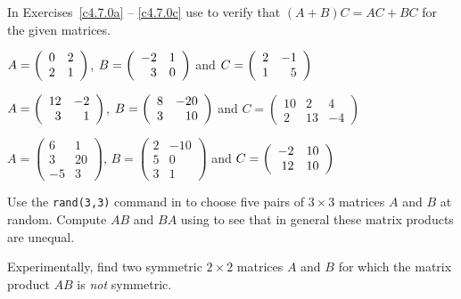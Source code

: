 \documentclass{ximera}
\begin{document}
\noindent In Exercises~\ref{c4.7.0a} -- \ref{c4.7.0c} use \Matlab to
verify that $(A+B)C = AC+BC$ for the given matrices.
\begin{exercise}  \label{c4.7.0a}
$A=\left(\begin{array}{rr} 0 & 2\\ 2 &1\end{array}\right)$, $B=\left(\begin{array}{rr} -2 & 1\\ 3 &0\end{array}\right)$ and $C=\left(\begin{array}{rr} 2 & -1\\ 1 &5\end{array}\right)$
\end{exercise}
\begin{exercise}  \label{c4.7.0b}
$A=\left(\begin{array}{rr} 12 & -2\\ 3 &1\end{array}\right)$,
$B=\left(\begin{array}{rr} 8 & -20\\ 3 &10\end{array}\right)$ and
$C=\left(\begin{array}{rrr} 10 & 2 & 4\\ 2 & 13 & -4 \end{array}\right)$
\end{exercise}
\begin{exercise}  \label{c4.7.0c}
$A=\left(\begin{array}{rr} 6 & 1 \\ 3 & 20 \\ -5 & 3\end{array}\right)$,
$B=\left(\begin{array}{rr} 2 & -10 \\ 5 & 0 \\ 3 & 1\end{array}\right)$ and
$C=\left(\begin{array}{rr} -2 & 10\\ 12 &10\end{array}\right)$
\end{exercise}

\begin{exercise} \label{c4.7.2}
Use the {\tt rand(3,3)} command in \Matlab to choose five pairs of
$3\times 3$ matrices $A$ and $B$ at random.  Compute $AB$ and $BA$
using \Matlab to see that in general these matrix products are unequal.
\end{exercise}

\begin{exercise} \label{c4.7.2.1}
Experimentally, find two symmetric $2\times 2$ matrices $A$ and $B$ for
which the matrix product $AB$ is {\em not\/} symmetric.
\end{exercise}
\end{document}
